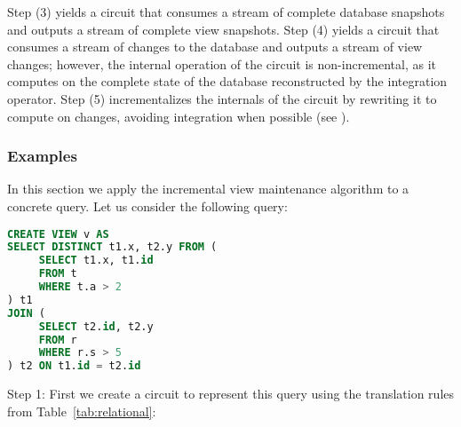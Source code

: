 Step (3) yields a circuit that consumes a stream of complete database snapshots and outputs a 
stream of complete view snapshots. Step (4) yields a circuit that consumes a stream of changes
to the database and outputs a stream of view changes; however, the internal operation of the 
circuit is non-incremental, as it computes on the complete state of the database reconstructed
by the integration operator.  Step (5) incrementalizes the internals of the circuit by rewriting 
it to compute on changes, avoiding integration when possible (see ).

\subsubsection{Examples}

In this section we apply the incremental view maintenance algorithm to a concrete
query.  Let us consider the following query:

\begin{lstlisting}[language=SQL]
CREATE VIEW v AS
SELECT DISTINCT t1.x, t2.y FROM (
     SELECT t1.x, t1.id 
     FROM t 
     WHERE t.a > 2 
) t1  
JOIN (
     SELECT t2.id, t2.y
     FROM r 
     WHERE r.s > 5 
) t2 ON t1.id = t2.id
\end{lstlisting}

Step 1: First we create a \dbsp circuit to represent this query using the
translation rules from Table~\ref{tab:relational}:

\noindent
{}

